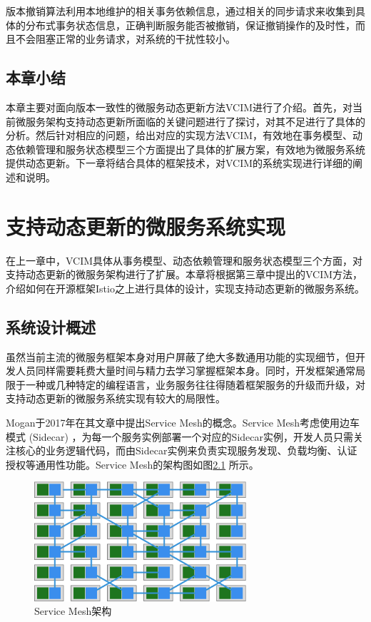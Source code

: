 \documentclass[macfonts,master]{njuthesis}
\begin{document}
版本撤销算法利用本地维护的相关事务依赖信息，通过相关的同步请求来收集到具体的分布式事务状态信息，正确判断服务能否被撤销，保证撤销操作的及时性，而且不会阻塞正常的业务请求，对系统的干扰性较小。

\section{本章小结}
本章主要对面向版本一致性的微服务动态更新方法VCIM进行了介绍。首先，对当前微服务架构支持动态更新所面临的关键问题进行了探讨，对其不足进行了具体的分析。然后针对相应的问题，给出对应的实现方法VCIM，有效地在事务模型、动态依赖管理和服务状态模型三个方面提出了具体的扩展方案，有效地为微服务系统提供动态更新。下一章将结合具体的框架技术，对VCIM的系统实现进行详细的阐述和说明。

\chapter{支持动态更新的微服务系统实现}\label{chapter_4}
在上一章中，VCIM具体从事务模型、动态依赖管理和服务状态模型三个方面，对支持动态更新的微服务架构进行了扩展。本章将根据第三章中提出的VCIM方法，介绍如何在开源框架Istio之上进行具体的设计，实现支持动态更新的微服务系统。

\section{系统设计概述}
虽然当前主流的微服务框架本身对用户屏蔽了绝大多数通用功能的实现细节，但开发人员同样需要耗费大量时间与精力去学习掌握框架本身。同时，开发框架通常局限于一种或几种特定的编程语言，业务服务往往得随着框架服务的升级而升级，对支持动态更新的微服务系统实现有较大的局限性。

Mogan于2017年在其文章中提出Service Mesh的概念\cite{morgan2017sa}。Service Mesh考虑使用边车模式 (Sidecar) ，为每一个服务实例部署一个对应的Sidecar实例，开发人员只需关注核心的业务逻辑代码，而由Sidecar实例来负责实现服务发现、负载均衡、认证授权等通用性功能\cite{li2019service,el2019guiding}。Service Mesh的架构图如图\ref{fig:service_mesh} 所示。

\begin{figure}[!htbp]
  \centering
  \includegraphics[width= 0.7\textwidth]{image/service_mesh.png}
  \caption{Service Mesh架构}
  \label{fig:service_mesh}
\end{figure}
\end{document}

